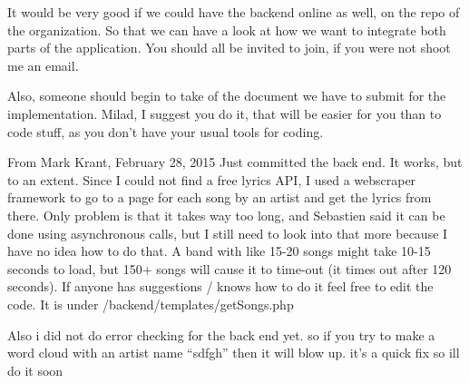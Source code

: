 \documentclass[]{article}
\begin{document}
It would be very good if we could have the backend online as well, on
the repo of the organization. So that we can have a look at how we want
to integrate both parts of the application. You should all be invited to
join, if you were not shoot me an email.

Also, someone should begin to take of the document we have to submit for
the implementation. Milad, I suggest you do it, that will be easier for
you than to code stuff, as you don't have your usual tools for coding.

From Mark Krant, February 28, 2015 Just committed the back end. It
works, but to an extent. Since I could not find a free lyrics API, I
used a webscraper framework to go to a page for each song by an artist
and get the lyrics from there. Only problem is that it takes way too
long, and Sebastien said it can be done using asynchronous calls, but I
still need to look into that more because I have no idea how to do that.
A band with like 15-20 songs might take 10-15 seconds to load, but 150+
songs will cause it to time-out (it times out after 120 seconds). If
anyone has suggestions / knows how to do it feel free to edit the code.
It is under /backend/templates/getSongs.php

Also i did not do error checking for the back end yet. so if you try to
make a word cloud with an artist name ``sdfgh'' then it will blow up.
it's a quick fix so ill do it soon
\end{document}

